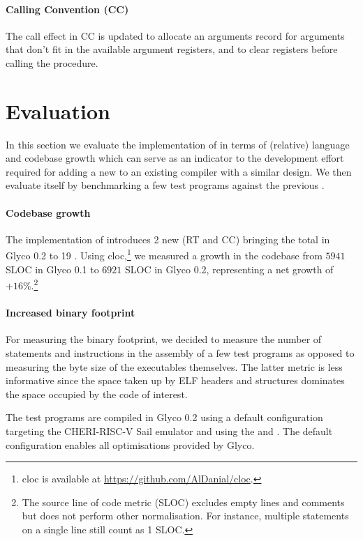 \documentclass[main.tex]{subfiles}
\begin{document}
\paragraph{Calling Convention (CC)} The call effect in CC is updated to allocate an arguments record for arguments that don't fit in the available argument registers, and to clear registers before calling the procedure.


\section{Evaluation} \label{sct:ghscc-eval}
In this section we evaluate the implementation of  in terms of (relative) language and codebase growth which can serve as an indicator to the development effort required for adding a new  to an existing  compiler with a similar design. We then evaluate  itself by benchmarking a few test programs against the previous .

\paragraph{Codebase growth} The implementation of  introduces 2 new  (RT and CC) bringing the total in Glyco 0.2 to 19 . Using cloc,\footnote{cloc is available at \url{https://github.com/AlDanial/cloc}.} we measured a growth in the codebase from $5941$ SLOC in Glyco 0.1 to $6921$ SLOC in Glyco 0.2, representing a net growth of $+16\%$.\footnote{The source line of code metric (SLOC) excludes empty lines and comments but does not perform other normalisation. For instance, multiple statements on a single line still count as 1 SLOC.}

\paragraph{Increased binary footprint} For measuring the binary footprint, we decided to measure the number of statements and instructions in the assembly of a few test programs as opposed to measuring the byte size of the executables themselves. The latter metric is less informative since the space taken up by ELF headers and structures dominates the space occupied by the code of interest.

The test programs are compiled in Glyco 0.2 using a default configuration targeting the CHERI-RISC-V Sail emulator and using the  and  . The default configuration enables all optimisations provided by Glyco.
\end{document}
